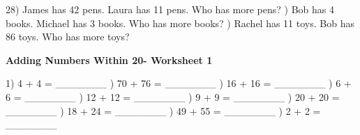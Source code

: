 \documentclass{article}%
\begin{document}
28) James has 42 pens. Laura has 11 pens. Who has more pens?%
\newline%
\newline%
) Bob has 4 books. Michael has 3 books. Who has more books?%
\newline%
\newline%
) Rachel has 11 toys. Bob has 86 toys. Who has more toys?%
\newline%
\newline%
\newline%
\pagebreak%
\large%
\begin{center}%
\textbf{Adding Numbers Within 20- Worksheet 1}%
\newline%
\newline%
\newline%
\end{center} \normalsize%
1) 4 + 4 = \_\_\_\_\_\_\_%
\newline%
\newline%
) 70 + 76 = \_\_\_\_\_\_\_%
\newline%
\newline%
) 16 + 16 = \_\_\_\_\_\_\_%
\newline%
\newline%
) 6 + 6 = \_\_\_\_\_\_\_%
\newline%
\newline%
) 12 + 12 = \_\_\_\_\_\_\_%
\newline%
\newline%
) 9 + 9 = \_\_\_\_\_\_\_%
\newline%
\newline%
) 20 + 20 = \_\_\_\_\_\_\_%
\newline%
\newline%
) 18 + 24 = \_\_\_\_\_\_\_%
\newline%
\newline%
) 49 + 55 = \_\_\_\_\_\_\_%
\newline%
\newline%
) 2 + 2 = \_\_\_\_\_\_\_%
\end{document}
